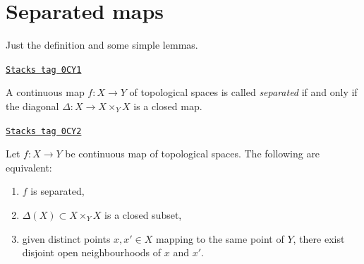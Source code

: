 \section{Separated maps}
\label{topology-section-separated}
Just the definition and some simple lemmas.

\begin{definition}[Separated]
\label{topology-definition-separated}
\href{https://stacks.math.columbia.edu/tag/0CY1}{\texttt{Stacks tag 0CY1}}

A continuous map $f : X \to Y$ of topological spaces is called
{\it separated} if and only if the diagonal $\Delta : X \to X \times_Y X$
is a closed map.
\end{definition}

\begin{lemma}[Separated]
\label{topology-lemma-separated}
\href{https://stacks.math.columbia.edu/tag/0CY2}{\texttt{Stacks tag 0CY2}}

Let $f : X \to Y$ be continuous map of topological spaces.
The following are equivalent:
\begin{enumerate}
\item $f$ is separated,
\item $\Delta(X) \subset X \times_Y X$ is a closed subset,
\item given distinct points $x, x' \in X$ mapping to the same point of
$Y$, there exist disjoint open neighbourhoods of $x$ and $x'$.
\end{enumerate}
\end{lemma}

